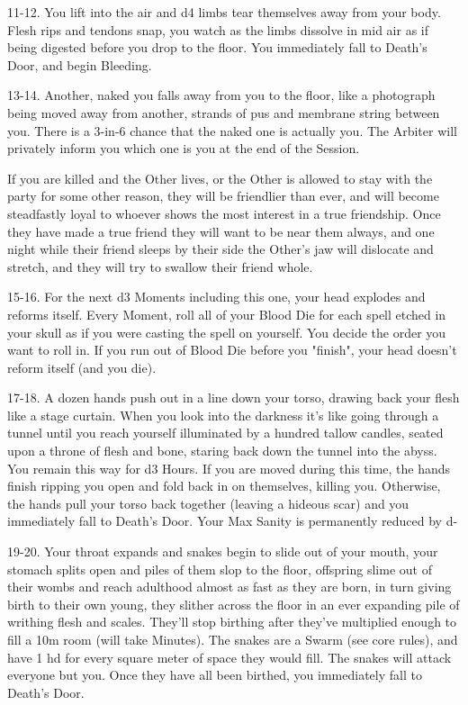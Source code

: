 11-12. You lift into the air and d4 limbs tear themselves away from your body. Flesh rips and tendons snap, you watch as the limbs dissolve in mid air as if being digested before you drop to the floor.  You immediately fall to Death's Door, and begin Bleeding.




13-14. Another, naked you falls away from you to the floor, like a photograph being moved away from another, strands of pus and membrane string between you. There is a 3-in-6 chance that the naked one is actually you.  The Arbiter will privately inform you which one is you at the end of the Session.

If you are killed and the Other lives, or the Other is allowed to stay with the party for some other reason, they will be friendlier than ever, and will become steadfastly loyal to whoever shows the most interest in a true friendship. Once they have made a true friend they will want to be near them always, and one night while their friend sleeps by their side the Other's jaw will dislocate and stretch, and they will try to swallow their friend whole.




15-16. For the next d3 Moments including this one, your head explodes and reforms itself.  Every Moment, roll all of your Blood Die for each spell etched in your skull as if you were casting the spell on yourself.  You decide the order you want to roll in.  If you run out of Blood Die before you "finish", your head doesn't reform itself (and you die).



17-18.  A dozen hands push out in a line down your torso, drawing back your flesh like a stage curtain. When you look into the darkness it's like going through a tunnel until you reach yourself illuminated by a hundred tallow candles, seated upon a throne of flesh and bone, staring back down the tunnel into the abyss.  You remain this way for d3 Hours.  If you are moved during this time, the hands finish ripping you open and fold back in on themselves, killing you.  Otherwise, the hands pull your torso back together (leaving a hideous scar) and you immediately fall to Death's Door.  Your Max Sanity is permanently reduced by {d-}



19-20. Your throat expands and snakes begin to slide out of your mouth, your stomach splits open and piles of them slop to the floor, offspring slime out of their wombs and reach adulthood almost as fast as they are born, in turn giving birth to their own young, they slither across the floor in an ever expanding pile of writhing flesh and scales. They'll stop birthing after they've multiplied enough to fill a 10m room (will take Minutes).  The snakes are a Swarm (see core rules), and have 1 {hd} for every square meter of space they would fill.  The snakes will attack everyone but you.  Once they have all been birthed, you immediately fall to Death's Door.


